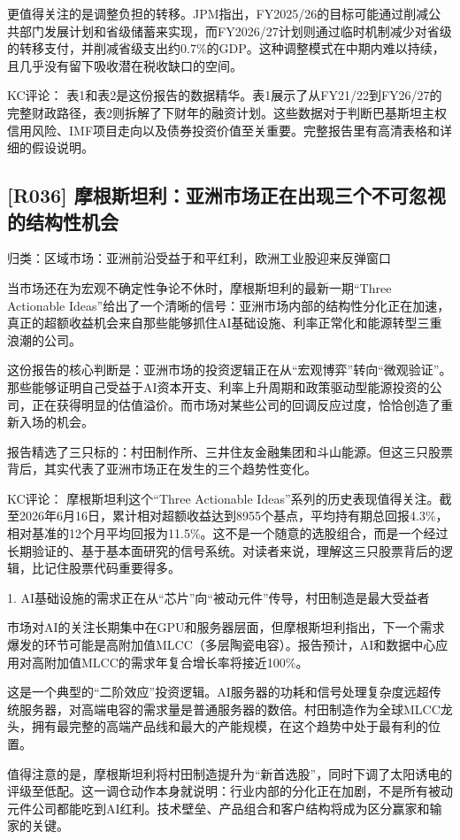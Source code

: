 \documentclass[11pt]{ctexart}
\begin{document}
更值得关注的是调整负担的转移。JPM指出，FY2025/26的目标可能通过削减公共部门发展计划和省级储蓄来实现，而FY2026/27计划则通过临时机制减少对省级的转移支付，并削减省级支出约0.7\%的GDP。这种调整模式在中期内难以持续，且几乎没有留下吸收潜在税收缺口的空间。

KC评论： 表1和表2是这份报告的数据精华。表1展示了从FY21/22到FY26/27的完整财政路径，表2则拆解了下财年的融资计划。这些数据对于判断巴基斯坦主权信用风险、IMF项目走向以及债券投资价值至关重要。完整报告里有高清表格和详细的假设说明。

\subsection{[R036] 摩根斯坦利：亚洲市场正在出现三个不可忽视的结构性机会}
{\small\color{refgray}归类：区域市场：亚洲前沿受益于和平红利，欧洲工业股迎来反弹窗口}

当市场还在为宏观不确定性争论不休时，摩根斯坦利的最新一期“Three Actionable Ideas”给出了一个清晰的信号：亚洲市场内部的结构性分化正在加速，真正的超额收益机会来自那些能够抓住AI基础设施、利率正常化和能源转型三重浪潮的公司。

这份报告的核心判断是：亚洲市场的投资逻辑正在从“宏观博弈”转向“微观验证”。那些能够证明自己受益于AI资本开支、利率上升周期和政策驱动型能源投资的公司，正在获得明显的估值溢价。而市场对某些公司的回调反应过度，恰恰创造了重新入场的机会。

报告精选了三只标的：村田制作所、三井住友金融集团和斗山能源。但这三只股票背后，其实代表了亚洲市场正在发生的三个趋势性变化。

KC评论： 摩根斯坦利这个“Three Actionable Ideas”系列的历史表现值得关注。截至2026年6月16日，累计相对超额收益达到8955个基点，平均持有期总回报4.3\%，相对基准的12个月平均回报为11.5\%。这不是一个随意的选股组合，而是一个经过长期验证的、基于基本面研究的信号系统。对读者来说，理解这三只股票背后的逻辑，比记住股票代码重要得多。

1. AI基础设施的需求正在从“芯片”向“被动元件”传导，村田制造是最大受益者

市场对AI的关注长期集中在GPU和服务器层面，但摩根斯坦利指出，下一个需求爆发的环节可能是高附加值MLCC（多层陶瓷电容）。报告预计，AI和数据中心应用对高附加值MLCC的需求年复合增长率将接近100\%。

这是一个典型的“二阶效应”投资逻辑。AI服务器的功耗和信号处理复杂度远超传统服务器，对高端电容的需求量是普通服务器的数倍。村田制造作为全球MLCC龙头，拥有最完整的高端产品线和最大的产能规模，在这个趋势中处于最有利的位置。

值得注意的是，摩根斯坦利将村田制造提升为“新首选股”，同时下调了太阳诱电的评级至低配。这一调仓动作本身就说明：行业内部的分化正在加剧，不是所有被动元件公司都能吃到AI红利。技术壁垒、产品组合和客户结构将成为区分赢家和输家的关键。
\end{document}
